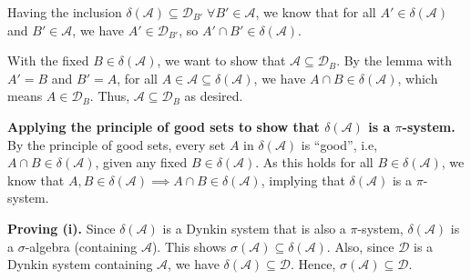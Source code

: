 \begin{enumerate}
\begin{pf}
\begin{pf}
Having the inclusion \(\delta(\mathcal{A})\subseteq \mathcal{D}_{B'}\;\forall
B'\in\mathcal{A}\), we know that for all \(A'\in\delta(\mathcal{A})\) and
\(B'\in\mathcal{A}\), we have \(A'\in\mathcal{D}_{B'}\), so \(A'\cap
B'\in\delta(\mathcal{A})\).
\end{pf}

With the fixed \(B\in\delta(\mathcal{A})\), we want to show that
\(\mathcal{A}\subseteq \mathcal{D}_{B}\).  By the lemma with \(A'=B\) and
\(B'=A\), for all \(A\in\mathcal{A}\subseteq \delta(\mathcal{A})\), we have \(A\cap B\in\delta(\mathcal{A})\),
which means \(A\in\mathcal{D}_{B}\). Thus, \(\mathcal{A}\subseteq
\mathcal{D}_{B}\) as desired.

\textbf{Applying the principle of good sets to show that
\(\delta(\mathcal{A})\) is a \(\pi\)-system.} By the principle of good sets,
every set \(A\) in \(\delta(\mathcal{A})\) is ``good'', i.e, \(A\cap
B\in\delta(\mathcal{A})\), given any fixed \(B\in\delta(\mathcal{A})\). As this
holds for all \(B\in\delta(\mathcal{A})\), we know that
\(A,B\in\delta(\mathcal{A})\implies A\cap B\in\delta(\mathcal{A})\), implying
that \(\delta(\mathcal{A})\) is a \(\pi\)-system.

\textbf{Proving (i).} Since \(\delta(\mathcal{A})\) is a Dynkin system that is
also a \(\pi\)-system, \(\delta(\mathcal{A})\) is a \(\sigma\)-algebra
(containing \(\mathcal{A}\)). This shows \(\sigma(\mathcal{A})\subseteq
\delta(\mathcal{A})\). Also, since \(\mathcal{D}\) is a Dynkin system
containing \(\mathcal{A}\), we have \(\delta(\mathcal{A})\subseteq
\mathcal{D}\). Hence, \(\sigma(\mathcal{A})\subseteq \mathcal{D}\).


\end{pf}
\end{enumerate}
